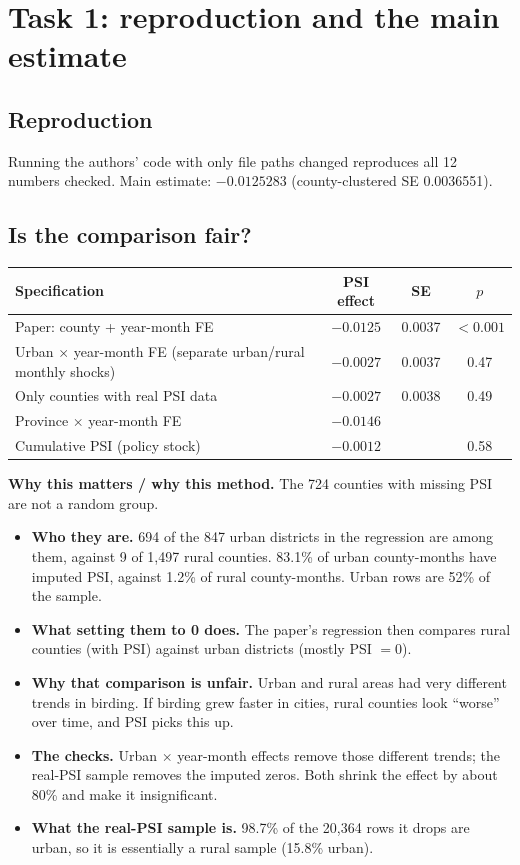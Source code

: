 \documentclass[11pt]{article}
\newcommand{\why}[1]{\begin{whybox}\small\textbf{Why this matters / why this method.} #1\end{whybox}}
\begin{document}
\section{Task 1: reproduction and the main estimate}
\subsection{Reproduction}
Running the authors' code with only file paths changed reproduces all 12 numbers checked. Main estimate: $-0.0125283$ (county-clustered SE 0.0036551).

\subsection{Is the comparison fair?}
\begin{center}\small
\begin{tabular}{lccc}
\toprule
Specification & PSI effect & SE & $p$ \\
\midrule
Paper: county + year-month FE & $-0.0125$ & 0.0037 & $<0.001$ \\
Urban $\times$ year-month FE (separate urban/rural monthly shocks) & $-0.0027$ & 0.0037 & 0.47 \\
Only counties with real PSI data & $-0.0027$ & 0.0038 & 0.49 \\
Province $\times$ year-month FE & $-0.0146$ & & \\
Cumulative PSI (policy stock) & $-0.0012$ & & 0.58 \\
\bottomrule
\end{tabular}
\end{center}

\why{The 724 counties with missing PSI are not a random group.
\begin{itemize}[leftmargin=12pt,itemsep=1pt,topsep=1pt]
\item \textbf{Who they are.} 694 of the 847 urban districts in the regression are among them, against 9 of 1,497 rural counties. 83.1\% of urban county-months have imputed PSI, against 1.2\% of rural county-months. Urban rows are 52\% of the sample.
\item \textbf{What setting them to 0 does.} The paper's regression then compares rural counties (with PSI) against urban districts (mostly PSI $=0$).
\item \textbf{Why that comparison is unfair.} Urban and rural areas had very different trends in birding. If birding grew faster in cities, rural counties look ``worse'' over time, and PSI picks this up.
\item \textbf{The checks.} Urban $\times$ year-month effects remove those different trends; the real-PSI sample removes the imputed zeros. Both shrink the effect by about 80\% and make it insignificant.
\item \textbf{What the real-PSI sample is.} 98.7\% of the 20,364 rows it drops are urban, so it is essentially a rural sample (15.8\% urban).
\end{itemize}}
\end{document}
